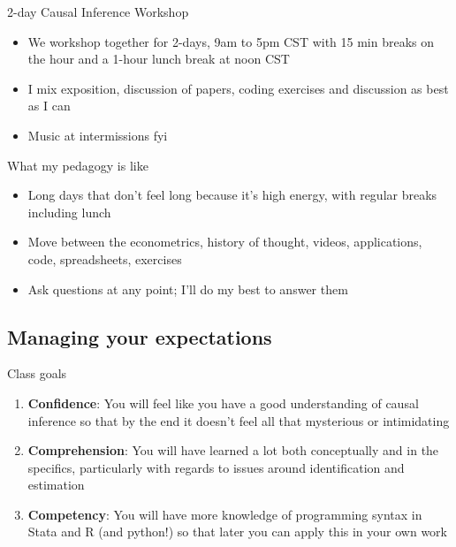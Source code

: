 \documentclass{beamer}
\begin{document}
\begin{frame}{2-day Causal Inference Workshop}

  \begin{itemize}
    \item We workshop together for 2-days, 9am to 5pm CST with 15 min breaks on the hour and a 1-hour lunch break at noon CST
    \item I mix exposition, discussion of papers, coding exercises and discussion as best as I can
    \item Music at intermissions fyi
  \end{itemize}

\end{frame}

\begin{frame}{What my pedagogy is like}

\begin{itemize}
\item Long days that don't feel long because it's high energy, with regular breaks including lunch
\item Move between the econometrics, history of thought, videos, applications, code, spreadsheets, exercises
\item Ask questions at any point; I'll do my best to answer them
\end{itemize}

\end{frame}


\subsection{Managing your expectations}

\begin{frame}{Class goals}

  \begin{enumerate}
    \item \textbf{Confidence}: You will feel like you have a good understanding of causal inference so that by the end it doesn't feel all that mysterious or intimidating
    \item \textbf{Comprehension}: You will have learned a lot both conceptually and in the specifics, particularly with regards to issues around identification and estimation
    \item \textbf{Competency}: You will have more knowledge of programming syntax in Stata and R (and python!) so that later you can apply this in your own work
  \end{enumerate}

\end{frame}
\end{document}
